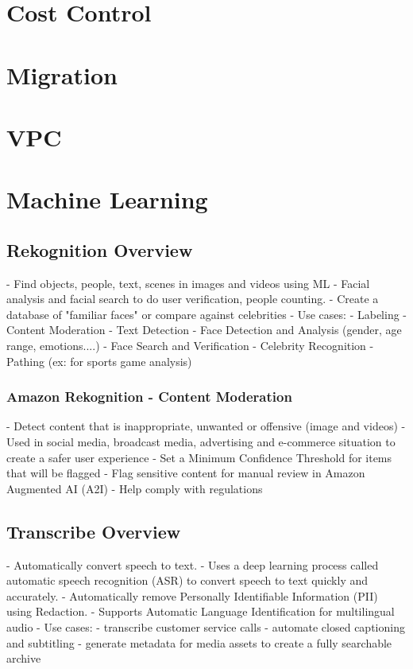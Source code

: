 \documentclass[11pt]{book}
\begin{document}
    \chapter{Cost Control}
    \chapter{Migration}
    \chapter{VPC}
    \chapter{Machine Learning}
    \section{Rekognition Overview}
    - Find objects, people, text, scenes in images and videos using ML
    - Facial analysis and facial search to do user verification, people counting.
    - Create a database of "familiar faces" or compare against celebrities
    - Use cases:
        - Labeling
        - Content Moderation
        - Text Detection
        - Face Detection and Analysis (gender, age range, emotions....)
        - Face Search and Verification
        - Celebrity Recognition
        - Pathing (ex: for sports game analysis)

    \subsection{Amazon Rekognition - Content Moderation}
    - Detect content that is inappropriate, unwanted or offensive (image and videos)
    - Used in social media, broadcast media, advertising and e-commerce situation to create a safer user experience
    - Set a Minimum Confidence Threshold for items that will be flagged
    - Flag sensitive content for manual review in Amazon Augmented AI (A2I)
    - Help comply with regulations

    \section{Transcribe Overview}
    - Automatically convert speech to text.
    - Uses a deep learning process called automatic speech recognition (ASR) to convert speech to text quickly and accurately.
    - Automatically remove Personally Identifiable Information (PII) using Redaction.
    - Supports Automatic Language Identification for multilingual audio
    - Use cases:
        - transcribe customer service calls
        - automate closed captioning and subtitling
        - generate metadata for media assets to create a fully searchable archive
\end{document}
